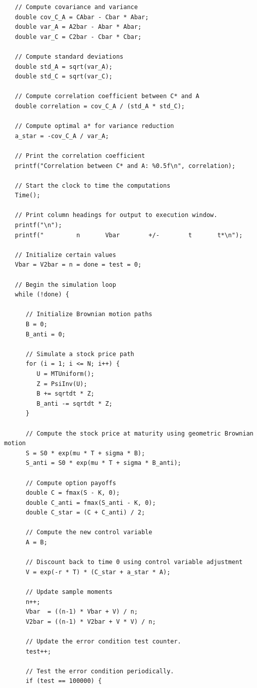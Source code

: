 \documentclass{report}
\begin{document}
\begin{lstlisting}
   // Compute covariance and variance
   double cov_C_A = CAbar - Cbar * Abar;
   double var_A = A2bar - Abar * Abar;
   double var_C = C2bar - Cbar * Cbar;

   // Compute standard deviations
   double std_A = sqrt(var_A);
   double std_C = sqrt(var_C);

   // Compute correlation coefficient between C* and A
   double correlation = cov_C_A / (std_A * std_C);

   // Compute optimal a* for variance reduction
   a_star = -cov_C_A / var_A;

   // Print the correlation coefficient
   printf("Correlation between C* and A: %0.5f\n", correlation);

   // Start the clock to time the computations
   Time();

   // Print column headings for output to execution window.
   printf("\n");
   printf("         n       Vbar        +/-        t       t*\n");

   // Initialize certain values
   Vbar = V2bar = n = done = test = 0;
   
   // Begin the simulation loop
   while (!done) {

      // Initialize Brownian motion paths
      B = 0;
      B_anti = 0;

      // Simulate a stock price path
      for (i = 1; i <= N; i++) {
         U = MTUniform();
         Z = PsiInv(U);
         B += sqrtdt * Z;
         B_anti -= sqrtdt * Z;
      }

      // Compute the stock price at maturity using geometric Brownian motion
      S = S0 * exp(mu * T + sigma * B);
      S_anti = S0 * exp(mu * T + sigma * B_anti);

      // Compute option payoffs
      double C = fmax(S - K, 0);
      double C_anti = fmax(S_anti - K, 0);
      double C_star = (C + C_anti) / 2;

      // Compute the new control variable
      A = B;

      // Discount back to time 0 using control variable adjustment
      V = exp(-r * T) * (C_star + a_star * A);

      // Update sample moments
      n++;
      Vbar  = ((n-1) * Vbar + V) / n;
      V2bar = ((n-1) * V2bar + V * V) / n;

      // Update the error condition test counter.
      test++;

      // Test the error condition periodically.
      if (test == 100000) {


\end{lstlisting}
\end{document}

